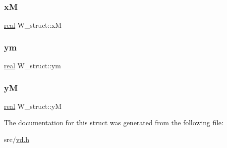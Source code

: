 \mbox{\label{structW__struct_a20e12df215aaa6a737a15b05e6102093}} 
\subsubsection{\texorpdfstring{xM}{xM}}
{\footnotesize\ttfamily \mbox{\hyperlink{typedefs_8h_a58a0c7cf2501f4492da833421be92547}{real}} W\+\_\+struct\+::xM}

\mbox{\label{structW__struct_a69290893bf3fc1a9bf0ff987a9e25320}} 
\subsubsection{\texorpdfstring{ym}{ym}}
{\footnotesize\ttfamily \mbox{\hyperlink{typedefs_8h_a58a0c7cf2501f4492da833421be92547}{real}} W\+\_\+struct\+::ym}

\mbox{\label{structW__struct_a10de004bf31c6563ad0a55116a96cd8d}} 
\subsubsection{\texorpdfstring{yM}{yM}}
{\footnotesize\ttfamily \mbox{\hyperlink{typedefs_8h_a58a0c7cf2501f4492da833421be92547}{real}} W\+\_\+struct\+::yM}



The documentation for this struct was generated from the following file\+:\begin{DoxyCompactItemize}
\item 
src/\mbox{\hyperlink{vd_8h}{vd.\+h}}\end{DoxyCompactItemize}
